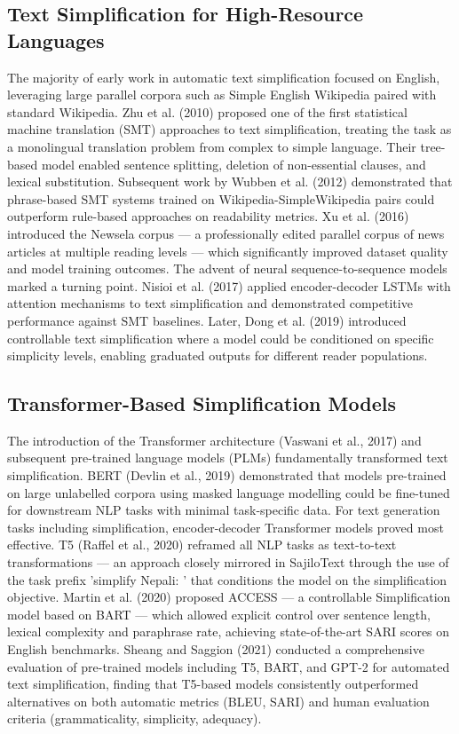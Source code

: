 \documentclass[12pt]{report}
\begin{document}
\subsection*{Text Simplification for High-Resource Languages}
The majority of early work in automatic text simplification focused on English, leveraging large parallel corpora such as Simple English Wikipedia paired with standard Wikipedia. Zhu et al. (2010) proposed one of the first statistical machine translation (SMT) approaches to text simplification, treating the task as a monolingual translation problem from complex to simple language. Their tree-based model enabled sentence splitting, deletion of non-essential clauses, and lexical substitution.
Subsequent work by Wubben et al. (2012) demonstrated that phrase-based SMT systems trained on Wikipedia-SimpleWikipedia pairs could outperform rule-based approaches on readability metrics. Xu et al. (2016) introduced the Newsela corpus — a professionally edited parallel corpus of news articles at multiple reading levels — which significantly improved dataset quality and model training outcomes.
The advent of neural sequence-to-sequence models marked a turning point. Nisioi et al. (2017) applied encoder-decoder LSTMs with attention mechanisms to text simplification and demonstrated competitive performance against SMT baselines. Later, Dong et al. (2019) introduced controllable text simplification where a model could be conditioned on specific simplicity levels, enabling graduated outputs for different reader populations.
\subsection{Transformer-Based Simplification Models} 
The introduction of the Transformer architecture (Vaswani et al., 2017) and subsequent pre-trained language models (PLMs) fundamentally transformed text simplification. BERT (Devlin et al., 2019) demonstrated that models pre-trained on large unlabelled corpora using masked language modelling could be fine-tuned for downstream NLP tasks with minimal task-specific data.
For text generation tasks including simplification, encoder-decoder Transformer models proved most effective. T5 (Raffel et al., 2020) reframed all NLP tasks as text-to-text transformations — an approach closely mirrored in SajiloText through the use of the task prefix 'simplify Nepali: ' that conditions the model on the simplification objective. Martin et al. (2020) proposed ACCESS — a controllable Simplification model based on BART — which allowed explicit control over sentence length, lexical complexity and paraphrase rate, achieving state-of-the-art SARI scores on English benchmarks.
Sheang and Saggion (2021) conducted a comprehensive evaluation of pre-trained models including T5, BART, and GPT-2 for automated text simplification, finding that T5-based models consistently outperformed alternatives on both automatic metrics (BLEU, SARI) and human evaluation criteria (grammaticality, simplicity, adequacy).
\end{document}

